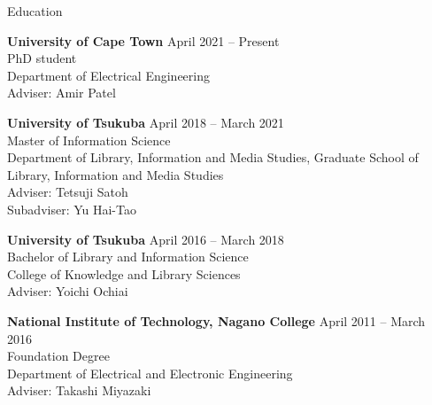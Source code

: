 \documentclass{resume} %
\begin{document}

\begin{rSection}{Education}

    {\bf University of Cape Town} \hfill {April 2021 -- Present}
    \\ PhD student
    \\ Department of Electrical Engineering
    \\ Adviser: Amir Patel

    {\bf University of Tsukuba} \hfill {April 2018 -- March 2021}
    \\ Master of Information Science
    \\ Department of Library, Information and Media Studies, Graduate School of Library, Information and Media Studies
    \\ Adviser: Tetsuji Satoh
    \\ Subadviser: Yu Hai-Tao

    {\bf University of Tsukuba} \hfill {April 2016 -- March 2018}
    \\ Bachelor of Library and Information Science
    \\ College of Knowledge and Library Sciences
    \\ Adviser: Yoichi Ochiai

    {\bf National Institute of Technology, Nagano College} \hfill {April 2011 -- March 2016}
    \\ Foundation Degree
    \\ Department of Electrical and Electronic Engineering
    \\ Adviser: Takashi Miyazaki

\end{rSection}

\end{document}
